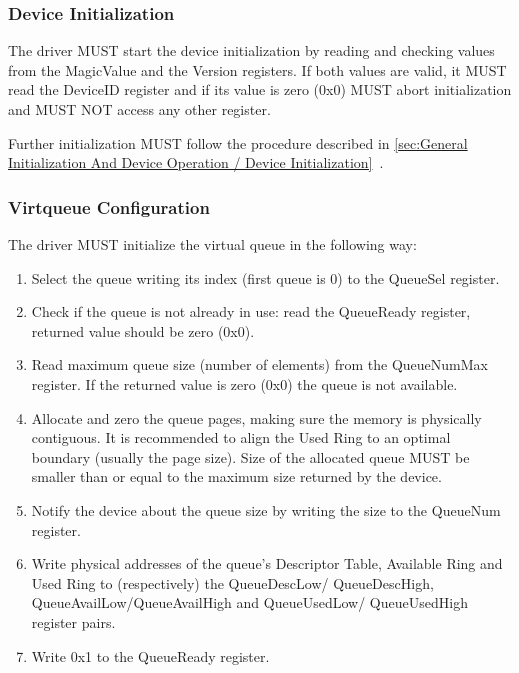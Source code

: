 \subsubsection{Device Initialization}\label{sec:Virtio Transport Options / Virtio Over MMIO / MMIO-specific Initialization And Device Operation / Device Initialization}

The driver MUST start the device initialization by reading and
checking values from the MagicValue and the Version registers.
If both values are valid, it MUST read the DeviceID register
and if its value is zero (0x0) MUST abort initialization and
MUST NOT access any other register.

Further initialization MUST follow the procedure described in
\ref{sec:General Initialization And Device Operation / Device Initialization}~.

\subsubsection{Virtqueue Configuration}\label{sec:Virtio Transport Options / Virtio Over MMIO / MMIO-specific Initialization And Device Operation / Virtqueue Configuration}

The driver MUST initialize the virtual queue in the following way:

\begin{enumerate}
\item Select the queue writing its index (first queue is 0) to the
   QueueSel register.

\item Check if the queue is not already in use: read the QueueReady
   register, returned value should be zero (0x0).

\item Read maximum queue size (number of elements) from the
   QueueNumMax register. If the returned value is zero (0x0) the
   queue is not available.

\item Allocate and zero the queue pages, making sure the memory
   is physically contiguous. It is recommended to align the
   Used Ring to an optimal boundary (usually the page size).
   Size of the allocated queue MUST be smaller than or equal to
   the maximum size returned by the device.

\item Notify the device about the queue size by writing the size to
   the QueueNum register.

\item Write physical addresses of the queue's Descriptor Table,
   Available Ring and Used Ring to (respectively) the QueueDescLow/
   QueueDescHigh, QueueAvailLow/QueueAvailHigh and QueueUsedLow/
   QueueUsedHigh register pairs.

\item Write 0x1 to the QueueReady register.
\end{enumerate}

